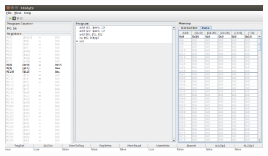 \begin{figure}[H]
  \centering
  \includegraphics[width=\textwidth]{images/data_memory_is_also_emboldened.png} 
  \label{fig:datamemory-is-bold-too}
\end{figure}




\clearpage

\printbibliography


